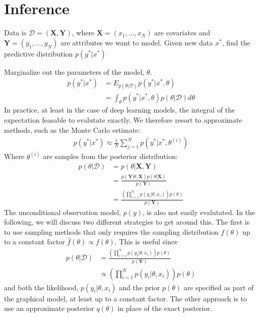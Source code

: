 \chapter{Inference}

Data is $\mathcal{D} = (\bm{X}, \bm{Y})$, where $\bm{X} = (x_1,\dots,x_N)$ are covariates and $\bm{Y} = (y_1, \dots, y_N)$ are attributes we want to model.
Given new data $x^\ast$, find the predictive distribution $p(y^\ast | x^\ast)$ 


Marginalize out the parameters of the model, $\theta$.
\begin{align*}
    p(y^\ast | x^\ast) &= E_{p(\theta|\mathcal{D})} p(y^\ast | x^\ast, \theta) \\
                       &= \int_{\theta} p(y^\ast | x^\ast, \theta)  p(\theta|\mathcal{D}) d\theta
\end{align*}
In practice, at least in the case of deep learning models, the integral of the expectation feasable to evalutate exactly. 
We therefore resort to approximate methods, such as the Monte Carlo estimate:
\begin{align*}
    p(y^\ast | x^\ast)  \approx \frac{1}{N} \sum_{j=1}^N p(y^\ast | x^\ast, \theta^{(i)}) 
\end{align*}
Where $\theta^{(i)}$ are samples from the posterior distribution:
\begin{align*}
    p(\theta | \mathcal{D}) 
    &= p(\theta | \bm{X}, \bm{Y}) \\
    &= \frac{p(\bm{Y} |\theta, \bm{X}) p(\theta|\bm{X})}{p(\bm{Y}) } \\
    &= \frac
    {\left(\prod_{i=1}^N p(y_i |\theta, x_i)\right) p(\theta)}
    {p(\bm{Y}) }  
\end{align*}
The unconditional  observation model, $p(y)$, is also not easily evalutated. 
In the following, we will discuss two different strategies to get around this. 
The first is to use sampling methods that only requires the sampling distribution $f(\theta)$ up to a constant factor $\hat{f}(\theta)\propto f(\theta)$. 
This is useful since 
\begin{align*}
    p(\theta | \mathcal{D}) 
    &= \frac
    {\left(\prod_{i=1}^N p(y_i |\theta, x_i)\right) p(\theta)}
    {p(\bm{Y}) }  \\
    &\propto \left(\prod_{i=1}^N p(y_i |\theta, x_i)\right) p(\theta)
\end{align*}
and both the likelihood, $p(y_i |\theta, x_i)$ and the prior $p(\theta)$ are specified as part of the graphical model, at least up to a constant factor. 
The other approach is to use an approximate posterior $q(\theta)$ in place of the exact posterior. 

